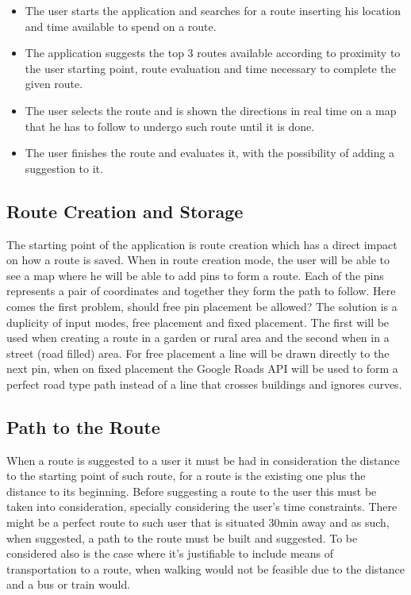 \documentclass{article}
\begin{document}
        \begin{itemize}  
            \item The user starts the application and searches for a route inserting his location and time available to spend on a route.
            \item The application suggests the top 3 routes available according to proximity to the user starting point, route evaluation and time necessary to complete the given route. 
            \item The user selects the route and is shown the directions in real time on a map that he has to follow to undergo such route until it is done.
            \item The user finishes the route and evaluates it, with the possibility of adding a suggestion to it. 
        \end{itemize}
        
        \subsection{Route Creation and Storage}
            The starting point of the application is route creation which has a direct impact on how a route is saved. When in route creation mode, the user
            will be able to see a map where he will be able to add pins to form a route. Each of the pins represents a pair of coordinates and together
            they form the path to follow. Here comes the first problem, should free pin placement be allowed? The solution is a duplicity of input modes, 
            free placement and fixed placement. The first will be used when creating a route in a garden or rural area and the second when in a street (road filled) area. 
            For free placement a line will be drawn directly to the next pin, when on fixed placement the Google Roads API will be used to form a perfect road 
            type path instead of a line that crosses buildings and ignores curves.

        \subsection{Path to the Route}
            When a route is suggested to a user it must be had in consideration the distance to the starting point of such route, for a route
            is the existing one plus the distance to its beginning. Before suggesting a route to the user this must be taken into consideration,
            specially considering the user's time constraints. There might be a perfect route to such user that is situated 30min away and 
            as such, when suggested, a path to the route must be built and suggested. To be considered also is the case where it's justifiable 
            to include means of transportation to a route, when walking would not be feasible due to the distance and a bus or train would.
        
\end{document}
